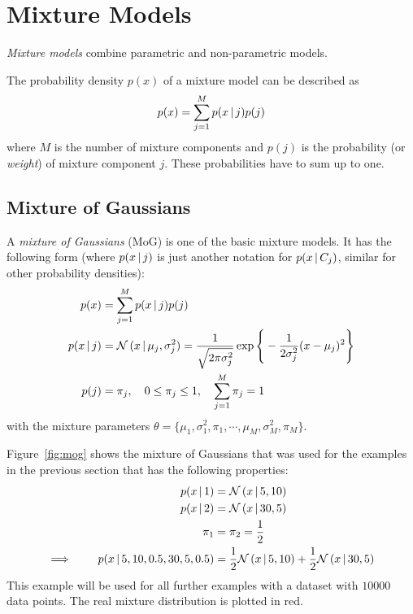 	\section{Mixture Models}
		\emph{Mixture models} combine parametric and non-parametric models.

		The probability density \(p(x)\) of a mixture model can be described as
		\begin{equation}
			p(x) = \sum_{j = 1}^{M} p(x \,\vert\, j) p(j)
		\end{equation}
		where \(M\) is the number of mixture components and \(p(j)\) is the probability (or \emph{weight}) of mixture component \(j\). These probabilities have to sum up to one.

		\subsection{Mixture of Gaussians}
			A \emph{mixture of Gaussians} (MoG) is one of the basic mixture models. It has the following form (where \( p(x \,\vert\, j) \) is just another notation for \( p(x \,\vert\, C_j) \), similar for other probability densities):
			\begin{align}
				p(x)          & = \sum_{j = 1}^{M} p(x \,\vert\, j) p(j)                                                                                                  \\
				p(x \,\vert\, j) & = \mathcal{N}\,(x \,\vert\, \mu_j, \sigma_j^2) = \frac{1}{\sqrt{2\pi\sigma_j^2}} \exp\Bigg\{ -\frac{1}{2\sigma_j^2} (x - \mu_j)^2 \Bigg\} \\
				p(j)          & = \pi_j, \quad 0 \leq \pi_j \leq 1, \quad \sum_{j = 1}^{M} \pi_j = 1
			\end{align}
			with the mixture parameters \( \theta = \{ \mu_1, \sigma_1^2, \pi_1, \cdots, \mu_M, \sigma_M^2, \pi_M \} \).

			Figure~\ref{fig:mog} shows the mixture of Gaussians that was used for the examples in the previous section that has the following properties:
			\begin{align}
				p(x \,\vert\, 1)                                     & = \mathcal{N}\,(x \,\vert\, 5, 10)                                                         \\
				p(x \,\vert\, 2)                                     & = \mathcal{N}\,(x \,\vert\, 30, 5)                                                         \\
				\pi_1                                             & = \pi_2 = \frac{1}{2}                                                                   \\
				\implies\qquad p(x \,\vert\, 5, 10, 0.5, 30, 5, 0.5) & = \frac{1}{2} \mathcal{N}\,(x \,\vert\, 5, 10) + \frac{1}{2} \mathcal{N}\,(x \,\vert\, 30, 5)
			\end{align}
			This example will be used for all further examples with a dataset with \(10000\) data points. The real mixture distribution is plotted in red.

